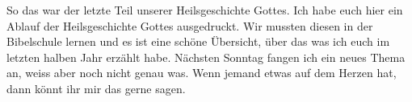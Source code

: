     \begin{otsblock}[Ende]
        So das war der letzte Teil unserer Heilsgeschichte Gottes. Ich habe euch hier ein Ablauf der Heilsgeschichte Gottes ausgedruckt. Wir mussten diesen in der Bibelschule lernen und es ist eine schöne Übersicht, über das was ich euch im letzten halben Jahr erzählt habe. Nächsten Sonntag fangen ich ein neues Thema an, weiss aber noch nicht genau was. Wenn jemand etwas auf dem Herzen hat, dann könnt ihr mir das gerne sagen. 
    \end{otsblock}